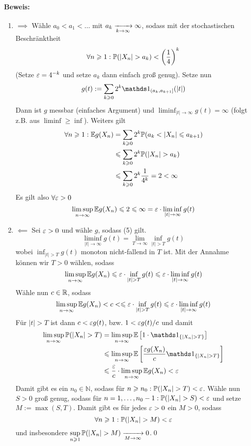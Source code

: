\documentclass[11pt]{report}
\begin{document}
\paragraph{Beweis:}
\begin{enumerate}[label=\Roman*.]
    \item $\implies$ \newline
    W\"ahle $a_0<a_1<\hdots$ mit $a_k\nto{}{k\to\infty}\infty$, sodass mit der stochastischen Beschr\"anktheit
    $$\forall n\geq1:\Pp(|X_n|>a_k)<\left(\frac{1}{4}\right)^k$$
    (Setze $\varepsilon=4^{-k}$ und setze $a_k$ dann einfach gro\ss{} genug). Setze nun 
    $$g(t):=\sum_{k\geq0}2^k\ind{(a_k,a_{k+1}]}(|t|)$$
    Dann ist $g$ messbar (einfaches Argument) und $\displaystyle\liminf_{|t|\to\infty}g(t)=\infty$ (folgt z.B. aus $\liminf\geq\inf$). Weiters gilt
    \begin{align*}
        \forall n\geq1:\E g(X_n)&=\sum_{k\geq0}2^k\Pp(a_k<|X_n|\leq a_{k+1})\\
        &\leq\sum_{k\geq0}2^k\Pp(|X_n|>a_k)\\
        &\leq\sum_{k\geq0}2^k\frac{1}{4^k}=2<\infty
    \end{align*}
    Es gilt also $\forall\varepsilon>0$
    $$\limsup_{n\to\infty}\mathbb{E} g(X_n)\leqslant2\leqslant\infty=\varepsilon\cdot\liminf_{|t|\to\infty}g(t)$$
    \item $\impliedby$ \newline
    Sei $\varepsilon>0$ und w\"ahle $g$, sodass (5) gilt. 
    $$\liminf_{|t|\to\infty}g(t)=\lim_{T\to\infty}\inf_{|t|>T}g(t)$$
    wobei $\inf_{|t|>T}g(t)$ monoton nicht-fallend in $T$ ist. Mit der Annahme k\"onnen wir $T>0$ w\"ahlen, sodass
    $$\limsup_{n\to\infty}\E g(X_n)\leq\eps\cdot\inf_{|t|>T}g(t)\leq\eps\cdot\liminf_{|t|\to\infty}g(t)$$
    W\"ahle nun $c\in\mathbb{R}$, sodass 
    $$\limsup_{n\to\infty}\E g(X_n)<c<\leq\eps\cdot\inf_{|t|>T}g(t)\leq\eps\cdot\liminf_{|t|\to\infty}g(t)$$
    F\"ur $|t|>T$ ist dann $c<\varepsilon g(t)$, bzw. $1<\varepsilon g(t)/c$ und damit
    \begin{align*}
        \limsup_{n\to\infty}\Pp(|X_n|>T)&=\limsup_{n\to\infty}\E\left[1\cdot\ind{\{|X_n|>T\}}\right]\\
        &\leq\limsup_{n\to\infty}\E\left[\dfrac{\eps g(X_n)}{c}\ind{\{|X_n|>T\}}\right]\\
        &\leq\dfrac{\eps}{c}\cdot\limsup_{n\to\infty}\E g(X_n)<\eps
    \end{align*}
    Damit gibt es ein $n_0\in\mathbb{N}$, sodass f\"ur $n\geq n_0: \Pp(|X_n|>T)<\eps$. W\"ahle nun $S>0$ gro\ss{} genug, sodass f\"ur $n=1,\hdots,n_0-1: \Pp(|X_n|>S)<\eps$ und setze $M:=\max(S,T)$. Damit gibt es f\"ur jedes $\varepsilon>0$ ein $M>0$, sodass
    $$\forall n\geq1: \Pp(|X_n|>M)<\eps$$
    und insbesondere $\displaystyle\sup_{n\geq1}\Pp(|X_n|>M)\nto{}{M\to\infty}0$.\qed
\end{enumerate}
\end{document}
